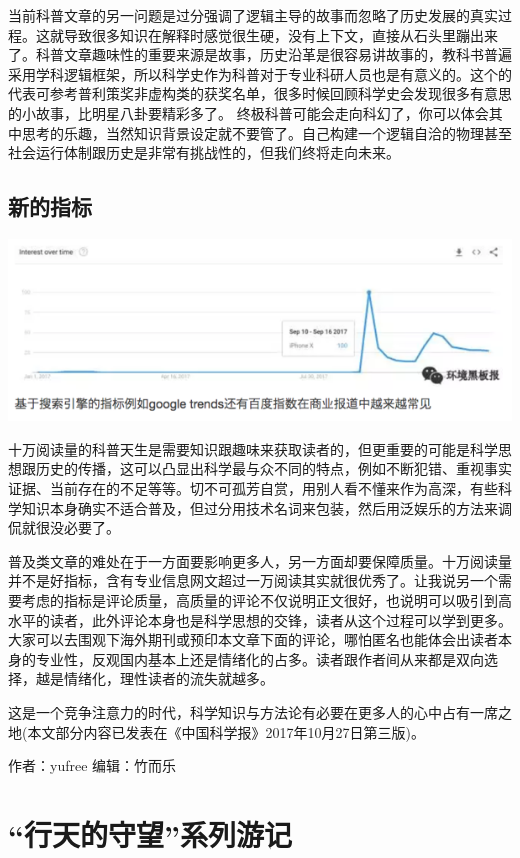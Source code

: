 \documentclass[]{book}
\begin{document}
当前科普文章的另一问题是过分强调了逻辑主导的故事而忽略了历史发展的真实过程。这就导致很多知识在解释时感觉很生硬，没有上下文，直接从石头里蹦出来了。科普文章趣味性的重要来源是故事，历史沿革是很容易讲故事的，教科书普遍采用学科逻辑框架，所以科学史作为科普对于专业科研人员也是有意义的。这个的代表可参考普利策奖非虚构类的获奖名单，很多时候回顾科学史会发现很多有意思的小故事，比明星八卦要精彩多了。
终极科普可能会走向科幻了，你可以体会其中思考的乐趣，当然知识背景设定就不要管了。自己构建一个逻辑自洽的物理甚至社会运行体制跟历史是非常有挑战性的，但我们终将走向未来。

\subsection{新的指标}

\includegraphics[width=8.33in]{images/pops8}

十万阅读量的科普天生是需要知识跟趣味来获取读者的，但更重要的可能是科学思想跟历史的传播，这可以凸显出科学最与众不同的特点，例如不断犯错、重视事实证据、当前存在的不足等等。切不可孤芳自赏，用别人看不懂来作为高深，有些科学知识本身确实不适合普及，但过分用技术名词来包装，然后用泛娱乐的方法来调侃就很没必要了。

普及类文章的难处在于一方面要影响更多人，另一方面却要保障质量。十万阅读量并不是好指标，含有专业信息网文超过一万阅读其实就很优秀了。让我说另一个需要考虑的指标是评论质量，高质量的评论不仅说明正文很好，也说明可以吸引到高水平的读者，此外评论本身也是科学思想的交锋，读者从这个过程可以学到更多。大家可以去围观下海外期刊或预印本文章下面的评论，哪怕匿名也能体会出读者本身的专业性，反观国内基本上还是情绪化的占多。读者跟作者间从来都是双向选择，越是情绪化，理性读者的流失就越多。

这是一个竞争注意力的时代，科学知识与方法论有必要在更多人的心中占有一席之地(本文部分内容已发表在《中国科学报》2017年10月27日第三版)。

作者：yufree 编辑：竹而乐

\section{\texorpdfstring{``行天的守望''系列游记}{行天的守望系列游记}}
\end{document}
